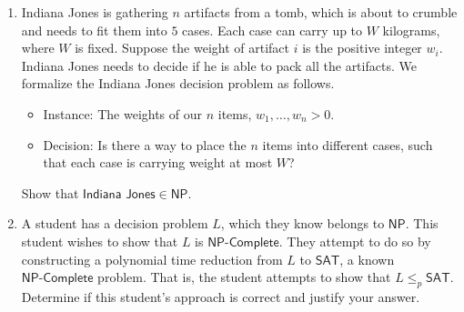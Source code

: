 \documentclass[12pt]{article}
\begin{document}
\begin{enumerate}

\item \label{1} Indiana Jones is gathering $n$ artifacts from a tomb, which is about to crumble and needs to fit them into $5$ cases. Each case can carry up to $W$ kilograms, where $W$ is fixed. Suppose the weight of artifact $i$ is the positive integer $w_{i}$. Indiana Jones needs to decide if he is able to pack all the artifacts. We formalize the \textsf{Indiana Jones} decision problem as follows.
\begin{itemize}
\item \textsf{Instance:} The weights of our $n$ items, $w_{1}, \ldots, w_{n} > 0$. 
\item \textsf{Decision:} Is there a way to place the $n$ items into different cases, such that each case is carrying weight at most $W$?
\end{itemize}

\noindent Show that $\textsf{Indiana Jones} \in \textsf{NP}.$


\newpage
\item \label{2} A student has a decision problem $L$, which they know belongs to $\textsf{NP}$. This student wishes to show that $L$ is $\textsf{NP-Complete}$. They attempt to do so by constructing a polynomial time reduction from $L$ to $\textsf{SAT}$, a known $\textsf{NP-Complete}$ problem. That is, the student attempts to show that $L \leq_{p} \textsf{SAT}$. Determine if this student's approach is correct and justify your answer.

\end{enumerate}
\end{document}
